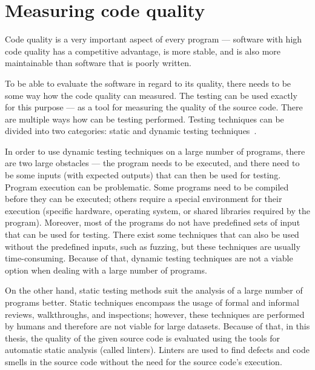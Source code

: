\documentclass[digital,oneside,oldtable,nolof,nolot,nocover]{fithesis4}
\begin{document}
\section{Measuring code quality}
\label{sec:orgb425696}
Code quality is a very important aspect of every program --- software with high
code quality has a competitive advantage, is more stable, and is also more
maintainable than software that is poorly written.

To be able to evaluate the software in regard to its quality, there needs to
be some way how the code quality can measured. The testing can be used exactly
for this purpose --- as a tool for measuring the quality of the source code.
There are multiple ways how can be testing performed. Testing techniques can
be divided into two categories: static and dynamic testing techniques~\cite{istqb}.

In order to use dynamic testing techniques on a large number of programs, there
are two large obstacles --- the program needs to be executed, and there need
to be some inputs (with expected outputs) that can then be used for testing.
Program execution can be problematic. Some programs need to be compiled
before they can be executed; others require a special environment for their
execution (specific hardware, operating system, or shared libraries required
by the program). Moreover, most of the programs do not have predefined sets of
input that can be used for testing. There exist some techniques that can also be
used without the predefined inputs, such as fuzzing, but these techniques
are usually time-consuming. Because of that, dynamic testing techniques are
not a viable option when dealing with a large number of programs.

On the other hand, static testing methods suit the analysis of a large
number of programs better. Static techniques encompass the usage of formal and
informal reviews, walkthroughs, and inspections; however, these techniques are
performed by humans and therefore are not viable for large datasets. Because
of that, in this thesis, the quality of the given source code is evaluated
using the tools for automatic static analysis (called linters). Linters are
used to find defects and code smells in the source code without the need for
the source code's execution.
\end{document}
